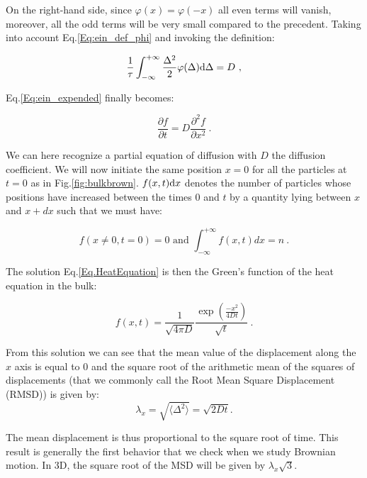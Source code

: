 On the right-hand side, since $\varphi(x) = \varphi(-x)$ all even terms will vanish, moreover, all the odd terms will be very small compared to the precedent. Taking into account Eq.\ref{Eq:ein_def_phi} and invoking the definition:



\begin{equation}
	\frac{1}{\tau} \int_{-\infty}^{+\infty} \frac{\Delta^2}{2}\varphi(\Delta)\textnormal{d}\Delta = D ~,
\end{equation}

Eq.\ref{Eq:ein_expended} finally becomes:

\begin{equation}
	\frac{\partial f}{\partial t} = D \frac{\partial ^2 f}{\partial x ^2} ~.
	\label{Eq.HeatEquation}
\end{equation}


We can here recognize a partial equation of diffusion with $D$ the diffusion coefficient. We will now initiate the same position $x=0$ for all the particles at $t=0$ as in Fig.\ref{fig:bulkbrown}. $f(x,t)\textnormal{d}x$ denotes the number of particles whose positions have increased between the times  $0$ and $t$  by a quantity lying between $x$ and $x + dx$ such that we must have:

\begin{equation}
	f(x \ne 0, t=0) = 0 \text{ and } \int_{-\infty}^{+\infty}f(x,t)dx = n ~.
\end{equation}

The solution Eq.\ref{Eq.HeatEquation} is then the Green's function of the heat equation in the bulk:


\begin{equation}
	f(x,t) = \frac{1}{\sqrt{4\pi D}} \frac{\exp \left(\frac{-x^2}{4Dt} \right)}{\sqrt{t}} ~.
\end{equation}

From this solution we can see that the mean value of the displacement along the $x$ axis is equal to $0$ and the square root of the arithmetic mean of the squares of displacements (that we commonly call the Root Mean Square Displacement (R\gls{MSD}))  is given by:
\begin{equation}
	\lambda _x = \sqrt{\langle \Delta ^2 \rangle} =  \sqrt{2Dt}.
	\label{Eq:MSD_ein}
\end{equation}

The mean displacement is thus proportional to the square root of time. This result is generally the first behavior that we check when we study Brownian motion. In 3D, the square root of the \gls{MSD} will be given by $\lambda_x \sqrt{3}$.

